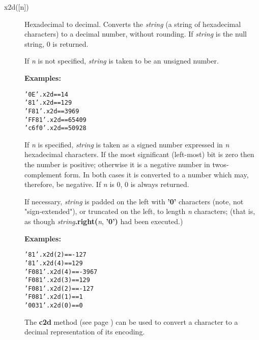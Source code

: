\begin{description}
\item[x2d([n{]})]\label{refx2d}
Hexadecimal to decimal.
Converts the \emph{string} (a string of hexadecimal characters) to
a decimal number, without rounding.
If \emph{string} is the null string, 0 is returned.
 
If \emph{n} is not specified, \emph{string} is taken to
be an unsigned number.
 
\textbf{Examples:}
\begin{alltt}
'0E'.x2d    == 14
'81'.x2d    == 129
'F81'.x2d   == 3969
'FF81'.x2d  == 65409
'c6f0'.x2d  == 50928
\end{alltt}
 
If \emph{n} is specified, \emph{string} is taken as a signed
number expressed in \emph{n} hexadecimal characters.
If the most significant (left-most) bit is zero then the number is
positive; otherwise it is a negative number in twos-complement form.
In both cases it is converted to a \nr{} number which may,
therefore, be negative.
If \emph{n} is 0, 0 is always returned.
 
If necessary, \emph{string} is padded on the left
with \textbf{'0'} characters (note, not "sign-extended"), or
truncated on the left, to length \emph{n} characters; (that is, as
though \emph{string}\textbf{.right(}\emph{n}, \textbf{'0')}
had been executed.)
 
\textbf{Examples:}
\begin{alltt}
'81'.x2d(2)   == -127
'81'.x2d(4)   == 129
'F081'.x2d(4) == -3967
'F081'.x2d(3) == 129
'F081'.x2d(2) == -127
'F081'.x2d(1) == 1
'0031'.x2d(0) == 0
\end{alltt}
 The  \textbf{c2d} method (see page \pageref{refc2d})  can be used to convert
a character to a decimal representation of its encoding.
\end{description}

